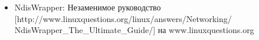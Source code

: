 \documentclass[10pt]{book}
\begin{document}
\newpage

\phantom{}
\begin{tcolorbox}[title=\textbf{Дальнейшие ресурсы}, colback=yellow!14!white, colframe=red!75!blue]
\begin{itemize}
\item NdisWrapper: Незаменимое руководство [http://www.linuxquestions.org/linux/answers/Networking/
NdisWrapper\_The\_Ultimate\_Guide/] на www.linuxquestions.org
\end{itemize}
\end{tcolorbox}

\newpage

\end{document}
